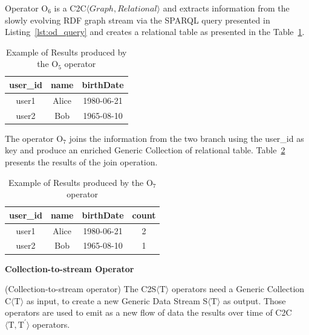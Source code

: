 \begin{Example}
\medskip

Operator O$_6$ is a C2C$\langle Graph,Relational\rangle$ and extracts information from the slowly evolving RDF graph stream via the SPARQL query presented in Listing~\ref{lst:od_query} and creates a relational table as presented in the Table~\ref{tbl:od_res}.

\begin{table}[ht]
\centering
\caption{Example of Results produced by the O$_5$ operator}
\label{tbl:od_res}
    \begin{tabular}{|c|c|c|}
        \hline
        \textbf{user\_id} & \textbf{name} & \textbf{birthDate} \\ \hline
        user1             & Alice         & 1980-06-21        \\ \hline
        user2             & Bob           & 1965-08-10        \\ \hline
    \end{tabular}
\end{table}

The operator O$_7$ joins the information from the two branch using the user\_id as key and produce an enriched Generic Collection of relational table. Table~\ref{tbl:oe_res} presents the results of the join operation.

\begin{table}[ht]
\centering
\caption{Example of Results produced by the O$_7$ operator}
\label{tbl:oe_res}
    \begin{tabular}{|c|c|c|c|}
        \hline
        \textbf{user\_id} & \textbf{name} & \textbf{birthDate} & \textbf{count} \\ \hline
        user1             & Alice         & 1980-06-21         & 2              \\ \hline
        user2             & Bob           & 1965-08-10         & 1              \\ \hline
    \end{tabular}
\end{table}
\end{Example}

\medskip
\noindent
\textbf{Collection-to-stream Operator}
\medskip

\begin{Definition}
(Collection-to-stream operator) The C2S$\langle\mathrm{T}\rangle$ operators need a Generic Collection C$\langle\mathrm{T}\rangle$ as input, to create a new Generic Data Stream S$\langle\mathrm{T}\rangle$ as output. 
Those operators are used to emit as a new flow of data the results over time of C2C$\langle\mathrm{T},\mathrm{T^{\prime}}\rangle$ operators. 
\end{Definition}

